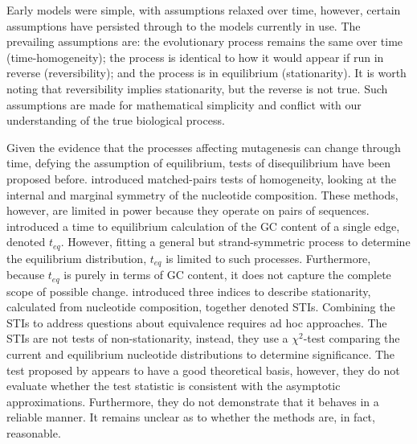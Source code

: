 Early models were simple, with assumptions relaxed over time, however, certain assumptions have persisted through to the models currently in use. The prevailing assumptions are: the evolutionary process remains the same over time (time-homogeneity); the process is identical to how it would appear if run in reverse (reversibility); and the process is in \gls{equilibrium} (stationarity). It is worth noting that reversibility implies stationarity, but the reverse is not true. Such assumptions are made for mathematical simplicity and conflict with our understanding of the true biological process. 

Given the evidence that the processes affecting mutagenesis can change through time, defying the assumption of equilibrium, tests of disequilibrium have been proposed before. \cite{Ababneh2006Matched-pairsSequences} introduced matched-pairs tests of homogeneity, looking at the internal and marginal symmetry of the nucleotide composition. These methods, however, are limited in power because they operate on pairs of sequences. \cite{Singh2009StrongDrosophila} introduced a time to equilibrium calculation of the GC content of a single edge, denoted $t_{eq}$. However, fitting a general but strand-symmetric process to determine the equilibrium distribution, $t_{eq}$ is limited to such processes. Furthermore, because $t_{eq}$ is purely in terms of GC content, it does not capture the complete scope of possible change. \cite{Squartini2008QuantifyingProcess} introduced three indices to describe stationarity, calculated from nucleotide composition, together denoted STIs. Combining the STIs to address questions about equivalence requires ad hoc approaches. The STIs are not tests of non-stationarity, instead, they use a $\chi^2$-test comparing the current and equilibrium nucleotide distributions to determine significance. The test proposed by \cite{Squartini2008QuantifyingProcess} appears to have a good theoretical basis, however, they do not evaluate whether the test statistic is consistent with the asymptotic approximations. Furthermore, they do not demonstrate that it behaves in a reliable manner. It remains unclear as to whether the methods are, in fact, reasonable. 

